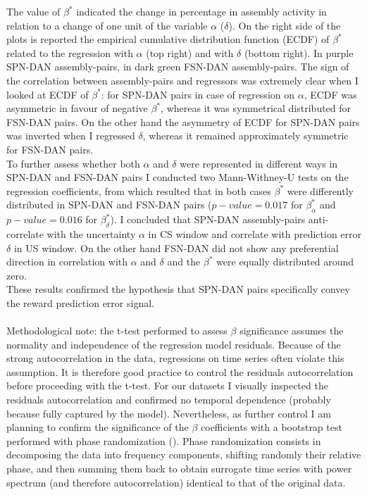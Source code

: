 The value of $\beta^*$ indicated the change in percentage in assembly activity in relation to a change of one unit of the variable $\alpha$ ($\delta$). On the right side of the plots is reported the empirical cumulative distribution function (ECDF) of $\beta^*$ related to the regression with $\alpha$ (top right) and with $\delta$ (bottom right). In purple SPN-DAN assembly-pairs, in dark green FSN-DAN assembly-pairs. The sign of the correlation between assembly-pairs and regressors was extremely clear when I looked at ECDF of $\beta^*$: for SPN-DAN pairs in case of regression on $\alpha$, ECDF was asymmetric in favour of negative $\beta^*$, whereas it was symmetrical distributed for FSN-DAN pairs. On the other hand the asymmetry of ECDF for SPN-DAN pairs was inverted when I regressed $\delta$, whereas it remained approximately symmetric for FSN-DAN pairs.\\To further assess whether both $\alpha$ and $\delta$ were represented in different ways in SPN-DAN and FSN-DAN pairs I conducted two Mann-Withney-U tests on the regression coefficients, from which resulted that in both cases $\beta^*$ were differently distributed in SPN-DAN and FSN-DAN pairs ($p-value=0.017$ for $\beta^*_{\alpha}$ and $p-value=0.016$ for $\beta^*_{\delta}$). I concluded that SPN-DAN assembly-pairs anti-correlate with the uncertainty $\alpha$ in CS window and correlate with prediction error $\delta$ in US window. On the other hand FSN-DAN did not show any preferential direction in correlation with $\alpha$ and $\delta$ and the $\beta^*$ were equally distributed around zero.\\These results confirmed the hypothesis that SPN-DAN pairs specifically convey the reward prediction error signal.\\\\
Methodological note: the t-test performed to assess $\beta$ significance assumes the normality and independence of the regression model residuals. Because of the strong autocorrelation in the data, regressions on time series often violate this assumption. It is therefore good practice to control the residuals autocorrelation before proceeding with the t-test. For our datasets I visually inspected the residuals autocorrelation and confirmed no temporal dependence (probably because fully captured by the model). Nevertheless, as further control I am planning to confirm the significance of the $\beta$ coefficients with a bootstrap test performed with phase randomization (\cite{Mokeichev}). Phase randomization consists in decomposing the data into frequency components, shifting randomly their relative phase, and then summing them back to obtain surrogate time series with power spectrum (and therefore autocorrelation) identical to that of the original data.
